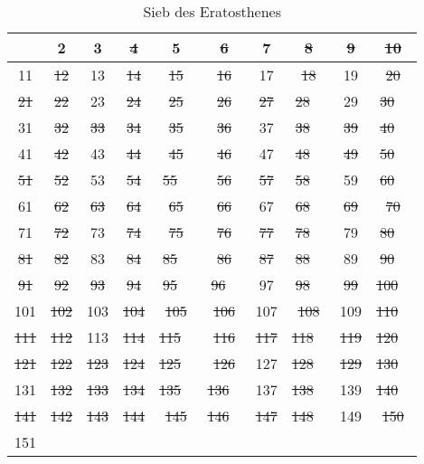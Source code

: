 \documentclass[german,12pt,a4paper]{article}
\begin{document}
\begin{table}\begin{center}
\begin{tabular}[h]{c|c|c|c|c|c|c|c|c|c}
   & 2 & 3 & \st{ 4 } & 5 & \st{ 6 } & 7 & \st{ 8 } & \st{ 9 } & \st{ 10 } \\
\hline
11 & \st{ 12 } & 13 & \st{ 14 } & \st{ 15 } & \st{ 16 } & 17 & \st{ 18 } & 19 & \st{ 20 } \\
\hline
\st{ 21 } & \st{ 22 } & 23 & \st{ 24 } & \st{ 25 } & \st{ 26 } & \st{ 27 } & \st{ 28 } & 29 & \st{ 30 } \\
\hline
31 & \st{ 32 } & \st{ 33 } & \st{ 34 } & \st{ 35 } & \st{ 36 } & 37 & \st{ 38 } & \st{ 39 } & \st{ 40 } \\
\hline
41 & \st{ 42 } & 43 & \st{ 44 } & \st{ 45 } & \st{ 46 } & 47 & \st{ 48 } & \st{ 49 } & \st{ 50 } \\
\hline
\st{ 51 } & \st{ 52 } & 53 & \st{ 54 } & \st{ 55 } & \st{ 56 } & \st{ 57 } & \st{ 58 } & 59 & \st{ 60 } \\
\hline
61 & \st{ 62 } & \st{ 63 } & \st{ 64 } & \st{ 65 } & \st{ 66 } & 67 & \st{ 68 } & \st{ 69 } & \st{ 70 } \\
\hline
71 & \st{ 72 } & 73 & \st{ 74 } & \st{ 75 } & \st{ 76 } & \st{ 77 } & \st{ 78 } & 79 & \st{ 80 } \\
\hline
\st{ 81 } & \st{ 82 } & 83 & \st{ 84 } & \st{ 85 } & \st{ 86 } & \st{ 87 } & \st{ 88 } & 89 & \st{ 90 } \\
\hline
\st{ 91 } & \st{ 92 } & \st{ 93 } & \st{ 94 } & \st{ 95 } & \st{ 96 } & 97 & \st{ 98 } & \st{ 99 } & \st{ 100 } \\
\hline
101 & \st{ 102 } & 103 & \st{ 104 } & \st{ 105 } & \st{ 106 } & 107 & \st{ 108 } & 109 & \st{ 110 } \\
\hline
\st{ 111 } & \st{ 112 } & 113 & \st{ 114 } & \st{ 115 } & \st{ 116 } & \st{ 117 } & \st{ 118 } & \st{ 119 } & \st{ 120 } \\
\hline
\st{ 121 } & \st{ 122 } & \st{ 123 } & \st{ 124 } & \st{ 125 } & \st{ 126 } & 127 & \st{ 128 } & \st{ 129 } & \st{ 130 } \\
\hline
131 & \st{ 132 } & \st{ 133 } & \st{ 134 } & \st{ 135 } & \st{ 136 } & 137 & \st{ 138 } & 139 & \st{ 140 } \\
\hline
\st{ 141 } & \st{ 142 } & \st{ 143 } & \st{ 144 } & \st{ 145 } & \st{ 146 } & \st{ 147 } & \st{ 148 } & 149 & \st{ 150 } \\
\hline
151 & & & & & & & & & \\
\end{tabular}\end{center}
\caption{Sieb des Eratosthenes}
\label{tab:Sieb des Eratosthenes}
\end{table}
\end{document}
